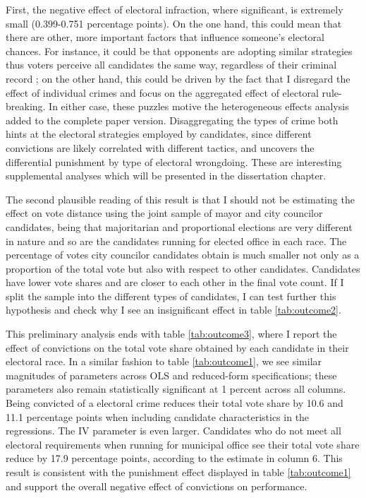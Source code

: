 \documentclass[11pt]{article}
\begin{document}
First, the negative effect of electoral infraction, where significant, is extremely small (0.399-0.751 percentage points). On the one hand, this could mean that there are other, more important factors that influence someone's electoral chances. For instance, it could be that opponents are adopting similar strategies thus voters perceive all candidates the same way, regardless of their criminal record \citep{PavaoCorruptionOnlyOption2018}; on the other hand, this could be driven by the fact that I disregard the effect of individual crimes and focus on the aggregated effect of electoral rule-breaking. In either case, these puzzles motive the heterogeneous effects analysis added to the complete paper version. Disaggregating the types of crime both hints at the electoral strategies employed by candidates, since different convictions are likely correlated with different tactics, and uncovers the differential punishment by type of electoral wrongdoing. These are interesting supplemental analyses which will be presented in the dissertation chapter.

The second plausible reading of this result is that I should not be estimating the effect on vote distance using the joint sample of mayor and city councilor candidates, being that majoritarian and proportional elections are very different in nature and so are the candidates running for elected office in each race. The percentage of votes city councilor candidates obtain is much smaller not only as a proportion of the total vote but also with respect to other candidates. Candidates have lower vote shares and are closer to each other in the final vote count. If I split the sample into the different types of candidates, I can test further this hypothesis and check why I see an insignificant effect in table \ref{tab:outcome2}.



This preliminary analysis ends with table \ref{tab:outcome3}, where I report the effect of convictions on the total vote share obtained by each candidate in their electoral race. In a similar fashion to table \ref{tab:outcome1}, we see similar magnitudes of parameters across OLS and reduced-form specifications; these parameters also remain statistically significant at 1 percent across all columns. Being convicted of a electoral crime reduces their total vote share by 10.6 and 11.1 percentage points when including candidate characteristics in the regressions. The IV parameter is even larger. Candidates who do not meet all electoral requirements when running for municipal office see their total vote share reduce by 17.9 percentage points, according to the estimate in column 6. This result is consistent with the punishment effect displayed in table \ref{tab:outcome1} and support the overall negative effect of convictions on performance.
\end{document}
